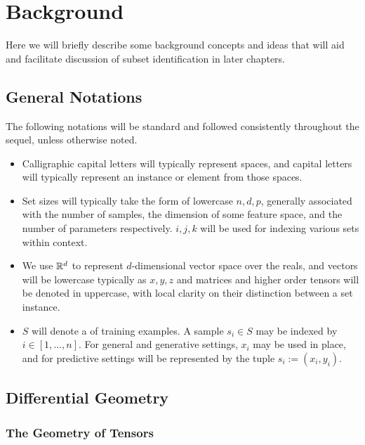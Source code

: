 \chapter{Background}\label{sec:bknd}

Here we will briefly describe some background concepts and ideas that will aid and facilitate discussion of subset identification in later chapters.

\section{General Notations}
The following notations will be standard and followed consistently throughout the sequel, unless otherwise noted.
\begin{itemize}
\item Calligraphic capital letters will typically represent spaces, and capital letters will typically represent an instance or element from those spaces.

\item Set sizes will typically take the form of lowercase $n,d,p$, generally associated with the number of samples, the dimension of some feature space, and the number of parameters respectively. $i,j,k$ will be used for indexing various sets within context.

\item We use $\mathbb{R}^d$ to represent $d$-dimensional vector space over the reals, and vectors will be lowercase typically as $x,y,z$ and matrices and higher order tensors will be denoted in uppercase, with local clarity on their distinction between a set instance.

\item $S$ will denote a of training examples.
A sample $s_i\in S$ may be indexed by $i \in [1,\ldots,n]$. 
For general and generative settings, $x_i$ may be used in place, and for predictive settings will be represented by the tuple $s_i:=(x_i,y_i)$.

\end{itemize}

\section{Differential Geometry}

\subsection{The Geometry of Tensors}

